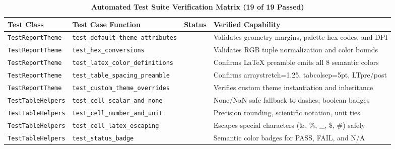 \documentclass[12pt,a4paper]{article}
\renewcommand{\arraystretch}{1.15}
\begin{document}
\begingroup
\renewcommand{\arraystretch}{0.95}
\setlength{\tabcolsep}{4pt}
\begin{table}[H]
  \centering
  \caption{\textbf{Automated Test Suite Verification Matrix (19 of 19 Passed)}}
  \label{tab:test-results}
  \vspace{0.15cm}
  \begin{tabularx}{\textwidth}{|p{3.4cm}|p{5.2cm}|c|X|}
    \hline
    \rowcolor{OsdagHeaderBg}
    \textbf{Test Class} & \textbf{Test Case Function} & \textbf{Status} & \textbf{Verified Capability} \\
    \hline
    \texttt{TestReportTheme} & \nolinkurl{test_default_theme_attributes} & \textbf{\color{OsdagPass}{PASS}} & Validates geometry margins, palette hex codes, and DPI \\
    \hline
    \rowcolor{OsdagZebra}
    \texttt{TestReportTheme} & \nolinkurl{test_hex_conversions} & \textbf{\color{OsdagPass}{PASS}} & Validates RGB tuple normalization and color bounds \\
    \hline
    \texttt{TestReportTheme} & \nolinkurl{test_latex_color_definitions} & \textbf{\color{OsdagPass}{PASS}} & Confirms LaTeX preamble emits all 8 semantic colors \\
    \hline
    \rowcolor{OsdagZebra}
    \texttt{TestReportTheme} & \nolinkurl{test_table_spacing_preamble} & \textbf{\color{OsdagPass}{PASS}} & Confirms arraystretch=1.25, tabcolsep=5pt, LTpre/post \\
    \hline
    \texttt{TestReportTheme} & \nolinkurl{test_custom_theme_overrides} & \textbf{\color{OsdagPass}{PASS}} & Verifies custom theme instantiation and inheritance \\
    \hline
    \rowcolor{OsdagZebra}
    \texttt{TestTableHelpers} & \nolinkurl{test_cell_scalar_and_none} & \textbf{\color{OsdagPass}{PASS}} & None/NaN safe fallback to dashes; boolean badges \\
    \hline
    \texttt{TestTableHelpers} & \nolinkurl{test_cell_number_and_unit} & \textbf{\color{OsdagPass}{PASS}} & Precision rounding, scientific notation, unit ties \\
    \hline
    \rowcolor{OsdagZebra}
    \texttt{TestTableHelpers} & \nolinkurl{test_cell_latex_escaping} & \textbf{\color{OsdagPass}{PASS}} & Escapes special characters (\&, \%, \_, \$, \#) safely \\
    \hline
    \texttt{TestTableHelpers} & \nolinkurl{test_status_badge} & \textbf{\color{OsdagPass}{PASS}} & Semantic color badges for PASS, FAIL, and N/A \\

\end{tabularx}
\end{table}
\end{document}
